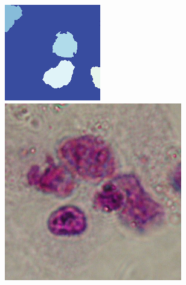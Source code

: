 \begin{figure}[b!]
	\includegraphics[width=0.97\linewidth]{Figures/Chapter2/6c3.png}
	\endminipage\hfill
	\centering	
	\includegraphics[width=0.97\linewidth]{Figures/Chapter2/6a4.png}	

\end{figure}

